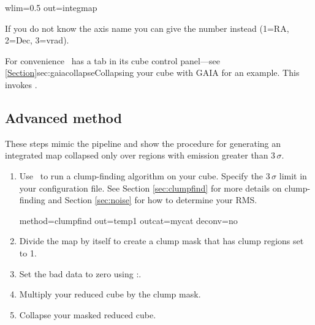 \documentclass[11pt,oneside,chapters]{starlink}
\providecommand{\nomagic}{\xref{\task{nomagic}}{sun95}{NOMAGIC}}
\begin{document}
\begin{terminalv}
  wlim=0.5 out=integmap
\end{terminalv}
If you do not know the axis name you can give the number instead
(1=RA, 2=Dec, 3=vrad).

For convenience \gaia\ has a  tab in its cube
control panel---see \cref{Section}{sec:gaiacollapse}{Collapsing your
cube with GAIA} for an example.  This invokes \collapse.


\subsection{Advanced method}

These steps mimic the pipeline and show the procedure for generating
an integrated map collapsed only over regions with emission greater
than 3\,$\sigma$.

\begin{enumerate}[label=(\arabic*)]
\item Use \findclumps\ to run a clump-finding algorithm on your cube.
Specify the 3\,$\sigma$ limit in your configuration file. See Section
\ref{sec:clumpfind} for more details on clump-finding and Section
\ref{sec:noise} for how to determine your RMS.
\begin{terminalv}
  method=clumpfind out=temp1 outcat=mycat deconv=no
\end{terminalv}

\item Divide the map by itself to create a clump mask that has clump
regions set to 1.
\begin{terminalv}
\end{terminalv}

\item Set the bad data to zero using \Kappa:\nomagic.
\begin{terminalv}
\end{terminalv}

\item Multiply your reduced cube by the clump mask.
\begin{terminalv}
\end{terminalv}

\item Collapse your masked reduced cube.
\begin{terminalv}
\end{terminalv}
\end{enumerate}
\end{document}
